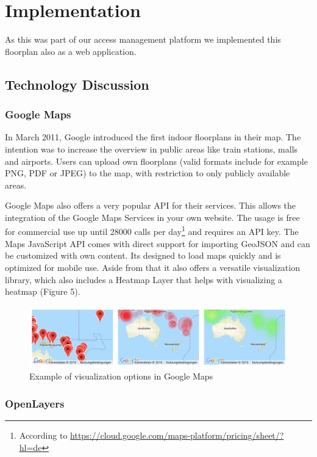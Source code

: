 \section{Implementation}
As this was part of our access management platform we implemented this floorplan also as a web application.



\subsection{Technology Discussion}

\subsubsection{Google Maps}
\label{Google Maps}

In March 2011, Google introduced the first indoor floorplans in their map. The intention was to increase the overview in public areas like train stations, malls and airports.
Users can upload own floorplans (valid formats include for example PNG, PDF or JPEG) to the map, with restriction to only publicly available areas.

Google Maps also offers a very popular API for their services. This allows the integration of the Google Maps Services in your own website. The usage is free for commercial use up until 28000 calls per day\footnote{According to \url{https://cloud.google.com/maps-platform/pricing/sheet/?hl=de}} and requires an API key.
The Maps JavaScript API comes with direct support for importing GeoJSON and can be customized with own content. Its designed to load maps quickly and is optimized for mobile use. Aside from that it also offers a versatile visualization library, which also includes a Heatmap Layer that helps with visualizing a heatmap (Figure 5).

\begin{figure}[!hb]
	\centering
	\includegraphics[width=1\linewidth]{images/GoogleMapsHeatmap}
	\caption{Example of visualization options in Google Maps}
	\label{fig:GoogleMapsHeatmap}
\end{figure}

\subsubsection{OpenLayers}
\label{OpenLayers}

